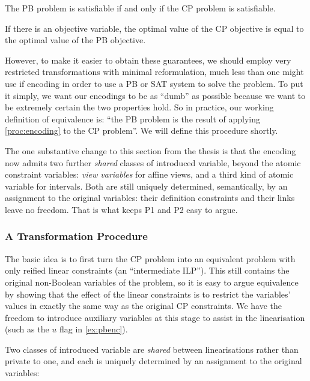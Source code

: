 \documentclass[11pt,a4paper]{article}
\theoremstyle{plain}
\theoremstyle{definition}
\theoremstyle{remark}
\begin{document}
\begin{description}[font=\normalfont\bfseries,leftmargin=2.4em]
  \item[P1.] The PB problem is satisfiable if and only if the CP problem is
    satisfiable.
  \item[P2.] If there is an objective variable, the optimal value of the CP
    objective is equal to the optimal value of the PB objective.
\end{description}

However, to make it easier to obtain these guarantees, we should employ very
restricted transformations with minimal reformulation, much less than one might
use if encoding in order to use a PB or SAT system to solve the problem.  To put
it simply, we want our encodings to be as ``dumb'' as possible because we want to
be extremely certain the two properties hold.  So in practice, our working
definition of equivalence is: ``the PB problem is the result of applying
\cref{proc:encoding} to the CP problem''.  We will define this procedure shortly.

The one substantive change to this section from the thesis is that the encoding
now admits two further \emph{shared} classes of introduced variable, beyond the
atomic constraint variables: \emph{view variables} for affine views,
and a third kind of atomic variable for intervals.  Both are still uniquely
determined, semantically, by an assignment to the original variables: their
definition constraints and their links leave no freedom.  That is what keeps P1
and P2 easy to argue.

\subsubsection{A Transformation Procedure}
\label{sec:transformation}

The basic idea is to first turn the CP problem into an equivalent problem with
only reified linear constraints (an ``intermediate ILP'').  This still contains
the original non-Boolean variables of the problem, so it is easy to argue
equivalence by showing that the effect of the linear constraints is to restrict
the variables' values in exactly the same way as the original CP constraints.
We have the freedom to introduce auxiliary variables at this stage to assist in
the linearisation (such as the $u$ flag in \cref{ex:pbenc}).

Two classes of introduced variable are \emph{shared} between linearisations
rather than private to one, and each is uniquely determined by an assignment to
the original variables:
\end{document}
